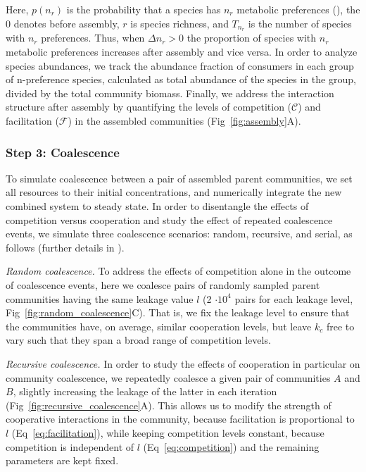 \documentclass[10pt,letterpaper]{article}
\begin{document}
Here, $p(n_r)$ is the probability that a species has $n_r$ metabolic preferences (), the 0 denotes before assembly, $r$ is species richness, and $T_{n_r}$ is the number of species with $n_r$ preferences. Thus, when $\Delta{n_r} > 0$ the proportion of species with $n_r$ metabolic preferences increases after assembly and vice versa. In order to analyze species abundances, we track the abundance fraction of consumers in each group of n-preference species, calculated as total abundance of the species in the group, divided by the total community biomass. Finally, we address the interaction structure after assembly by quantifying the levels of competition ($\mathcal{C}$) and facilitation ($\mathcal{F}$) in the assembled communities (Fig~\ref{fig:assembly}A).

\subsubsection*{Step 3: Coalescence}\vspace{-5pt}

To simulate coalescence between a pair of assembled parent communities, we set all resources to their initial concentrations, and numerically integrate the new combined system to steady state. In order to disentangle the effects of competition versus cooperation and study the effect of repeated coalescence events, we simulate three coalescence scenarios: random, recursive, and serial, as follows (further details in ).\vspace{7pt}

\hspace{-14pt}\textit{Random coalescence.} To address the effects of competition alone in the outcome of coalescence events, here we coalesce  pairs of randomly sampled parent communities having the same leakage value $l$ (2 $\cdot 10^4$ pairs for each leakage level, Fig~\ref{fig:random_coalescence}C). That is, we fix the leakage level to ensure that the communities have, on average, similar cooperation levels, but leave $k_c$ free to vary such that they span a broad range of competition levels.\vspace{7pt}

\hspace{-14pt}\textit{Recursive coalescence.} In order to study the effects of cooperation in particular on community coalescence, we repeatedly coalesce a given pair of communities $A$ and $B$, slightly increasing the leakage of the latter in each iteration (Fig~\ref{fig:recursive_coalescence}A). This allows us to modify the strength of cooperative interactions in the community, because facilitation is proportional to $l$ (Eq~\ref{eq:facilitation}), while keeping competition levels constant, because competition is independent of $l$ (Eq~\ref{eq:competition}) and the remaining parameters are kept fixed.\vspace{7pt}
\end{document}
